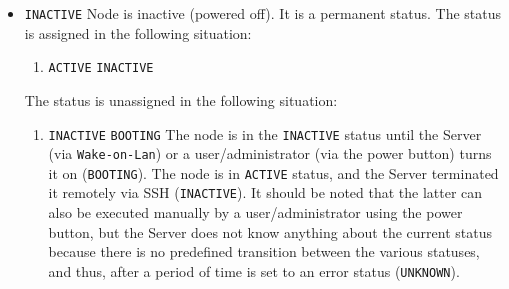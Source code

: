 \begin{itemize}
\begin{itemize}
      \item \texttt{INACTIVE}
        \newline
        Node is inactive (powered off).
        \newline
        It is a permanent status.
        \newline
        The status is assigned in the following situation:
        \begin{enumerate}
          \item \texttt{ACTIVE}  \texttt{INACTIVE}
            \newline
        \end{enumerate}
        The status is unassigned in the following situation:
        \begin{enumerate}
          \item \texttt{INACTIVE}  \texttt{BOOTING}
            \newline
            The node is in the \texttt{INACTIVE} status until the Server (via
            \texttt{Wake-on-Lan}) or a user/administrator (via the power button)
            turns it on (\texttt{BOOTING}).
            \newline
            The node is in \texttt{ACTIVE} status, and the Server terminated it
            remotely via SSH (\texttt{INACTIVE}).
            \newline
            It should be noted that the latter can also be executed manually by
            a user/administrator using the power button, but the Server does not
            know anything about the current status because there is no predefined
            transition between the various statuses, and thus, after a period of
            time is set to an error status (\texttt{UNKNOWN}).
        \end{enumerate}


\end{itemize}
\end{itemize}
